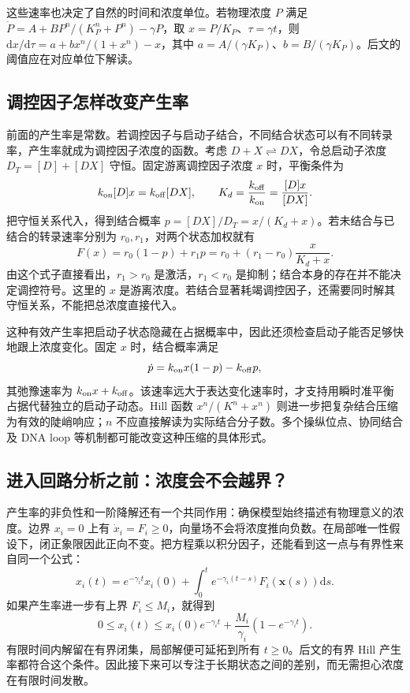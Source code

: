 \documentclass[11pt,a4paper,UTF8,fontset=fandol]{ctexart}
\newcommand{\dd}{\mathrm d}\newcommand{\R}{\mathbb R}\newcommand{\ssv}{\mathrm{ss}}
\begin{document}
这些速率也决定了自然的时间和浓度单位。若物理浓度 $P$ 满足 $\dot P=A+B P^n/(K_P^n+P^n)-\gamma P$，取 $x=P/K_P$、$\tau=\gamma t$，则
$\dd x/\dd\tau=a+b x^n/(1+x^n)-x$，其中 $a=A/(\gamma K_P)$、$b=B/(\gamma K_P)$。后文的阈值应在对应单位下解读。

\subsection{调控因子怎样改变产生率}
前面的产生率是常数。若调控因子与启动子结合，不同结合状态可以有不同转录率，产生率就成为调控因子浓度的函数。考虑 $D+X\rightleftharpoons DX$，令总启动子浓度 $D_T=[D]+[DX]$ 守恒。固定游离调控因子浓度 $x$ 时，平衡条件为
\[
k_{\rm on}[D]x=k_{\rm off}[DX],\qquad K_d=\frac{k_{\rm off}}{k_{\rm on}}=\frac{[D]x}{[DX]}.
\]
把守恒关系代入，得到结合概率 $p=[DX]/D_T=x/(K_d+x)$。若未结合与已结合的转录速率分别为 $r_0,r_1$，对两个状态加权就有
\begin{equation}F(x)=r_0(1-p)+r_1p=r_0+(r_1-r_0)\frac{x}{K_d+x}.\label{eq:occupancy}\end{equation}
由这个式子直接看出，$r_1>r_0$ 是激活，$r_1<r_0$ 是抑制；结合本身的存在并不能决定调控符号。这里的 $x$ 是游离浓度。若结合显著耗竭调控因子，还需要同时解其守恒关系，不能把总浓度直接代入。

这种有效产生率把启动子状态隐藏在占据概率中，因此还须检查启动子能否足够快地跟上浓度变化。固定 $x$ 时，结合概率满足
\[
\dot p=k_{\rm on}x(1-p)-k_{\rm off}p,
\]
其弛豫速率为 $k_{\rm on}x+k_{\rm off}$。该速率远大于表达变化速率时，才支持用瞬时准平衡占据代替独立的启动子动态。Hill 函数 $x^n/(K^n+x^n)$ 则进一步把复杂结合压缩为有效的陡峭响应；$n$ 不应直接解读为实际结合分子数。多个操纵位点、协同结合及 DNA loop 等机制都可能改变这种压缩的具体形式。

\subsection{进入回路分析之前：浓度会不会越界？}
产生率的非负性和一阶降解还有一个共同作用：确保模型始终描述有物理意义的浓度。边界 $x_i=0$ 上有 $\dot x_i=F_i\geq0$，向量场不会将浓度推向负数。在局部唯一性假设下，闭正象限因此正向不变。把方程乘以积分因子，还能看到这一点与有界性来自同一个公式：
\[
x_i(t)=e^{-\gamma_it}x_i(0)+\int_0^t e^{-\gamma_i(t-s)}F_i(\bm x(s))\dd s.
\]
如果产生率进一步有上界 $F_i\leq M_i$，就得到
\begin{equation}
0\leq x_i(t)\leq x_i(0)e^{-\gamma_it}+\frac{M_i}{\gamma_i}(1-e^{-\gamma_it}).\label{eq:bound}
\end{equation}
有限时间内解留在有界闭集，局部解便可延拓到所有 $t\geq0$。后文的有界 Hill 产生率都符合这个条件。因此接下来可以专注于长期状态之间的差别，而无需担心浓度在有限时间发散。
\end{document}
